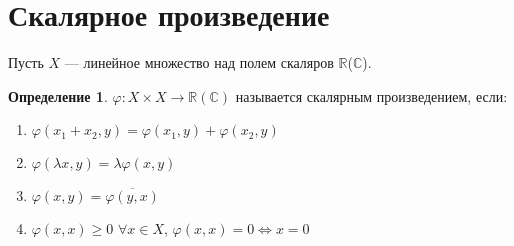 \documentclass[11pt,openany,a4paper]{scrartcl}
\theoremstyle{plain}
\theoremstyle{definition}
\newtheorem{definition}[theorem]{Определение}
\newcommand\mb{\mathbb}
\newcommand\real{\mb R}
\newcommand{\complex}{\mb C}
\newcommand\ol{\overline}
\begin{document}
\section{Скалярное произведение}

Пусть $X$ — линейное множество над полем скаляров $\real$($\complex$).

\begin{definition}
    $\varphi: X \times X \to \real(\complex)$ называется скалярным произведением,
    если:
    \begin{enumerate}
        \item $\varphi(x_1 + x_2, y) = \varphi(x_1, y) + \varphi(x_2, y)$
        \item $\varphi(\lambda x, y) = \lambda \varphi(x, y)$
        \item $\varphi(x, y) = \ol{\varphi(y, x)}$
        \item $\varphi(x, x) \geqslant 0$ $\forall x \in X$,
        $\varphi(x, x) = 0 \iff x = 0$
    \end{enumerate}
\end{definition}
\end{document}
